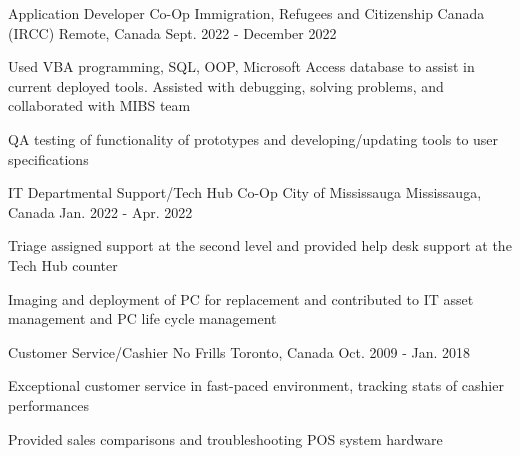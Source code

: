 \begin{cventries}
  \cventry
    {Application Developer Co-Op}
    {Immigration, Refugees and Citizenship Canada (IRCC)}
    {Remote, Canada}
    {Sept. 2022 - December 2022}
    {
      \begin{cvitems}
        \item {Used VBA programming, SQL, OOP, Microsoft Access database to assist in current deployed tools. Assisted with debugging, solving problems, and collaborated with MIBS team}
        \item {QA testing of functionality of prototypes and developing/updating tools to user specifications}
      \end{cvitems}
    }
      \cventry
    {IT Departmental Support/Tech Hub Co-Op}
    {City of Mississauga}
    {Mississauga, Canada}
    {Jan. 2022 - Apr. 2022}
    {
      \begin{cvitems}
        \item {Triage assigned support at the second level and provided help desk support at the Tech Hub counter}
        \item {Imaging and deployment of PC for replacement and contributed to IT asset management and PC life cycle management }
      \end{cvitems}
    }
  \cventry
    {Customer Service/Cashier}
    {No Frills}
    {Toronto, Canada}
    {Oct. 2009 - Jan. 2018}
    {
      \begin{cvitems}
        \item {Exceptional customer service in fast-paced environment, tracking stats of cashier performances}
        \item {Provided sales comparisons and troubleshooting POS system hardware}
      \end{cvitems}
    }
\end{cventries}